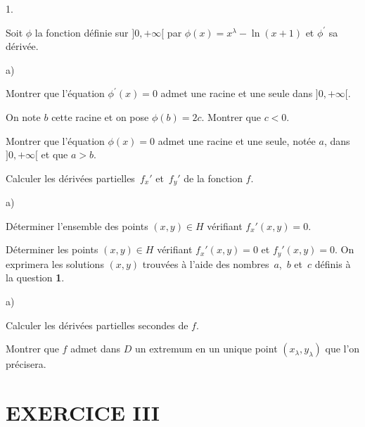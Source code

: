 \documentclass[11pt]{article}%
\begin{document}
\begin{noliste}{1.}
 \setlength{\itemsep}{4mm}
\item Soit $\phi$ la fonction définie sur $]0, + \infty[$ par $\phi(x)
= 
x^\lambda - \ln(x + 1)$ et $\phi^{\prime}$ sa dérivée.

\begin{noliste}{a)}
 \setlength{\itemsep}{2mm}
\item Montrer que l'équation $\phi^{\prime}(x) = 0$ admet une racine et
une seule dans $]0, + \infty[$.

On note $b$ cette racine et on pose $\phi(b) = 2c$. Montrer que $c <
0$.

\item Montrer que l'équation $\phi(x) = 0$ admet une racine et une
seule,
notée $a$, dans $]0, + \infty[$ et que $a > b$.
\end{noliste}

\item Calculer les dérivées partielles $\,f_{x}{\prime }$ et
$\,f_{y}{\prime }$ de la fonction $f$.

\item 

\begin{noliste}{a)}
 \setlength{\itemsep}{2mm}
\item Déterminer l'ensemble des points $(x,y)\in H$ vérifiant
$f_{x}{\prime
}(x,y) = 0$.

\item Déterminer les points $(x,y)\in H$ vérifiant $f_{x}{\prime }(x,y)
= 0$
et $f_{y}{\prime }(x,y) = 0$. On exprimera les solutions $(x,y)$
trouvées à
l'aide des nombres $\,a$, $\,b$ et $\,c$ définis à la question
\textbf{1}.
\end{noliste}

\item 

\begin{noliste}{a)}
 \setlength{\itemsep}{2mm}
\item Calculer les dérivées partielles secondes de $f$.

\item Montrer que $f$ admet dans $D$ un extremum en un unique point
$(x_{\lambda },y_{\lambda })$ que l'on précisera.
\end{noliste}
\end{noliste}

\section*{\textbf{EXERCICE III}}
\end{document}
